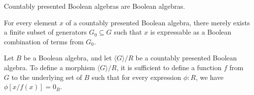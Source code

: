 \documentclass{../util/zariski-small}
\begin{document}
\begin{remark}
  Countably presented Boolean algebras are Boolean algebras. 
\end{remark}
\begin{remark}
  For every element $x$ of a countably presented Boolean algebra, 
  there merely exists a finite subset of generators $G_0\subseteq G$ such that $x$ is expressable 
  as a Boolean combination of terms from $G_0$. 
\end{remark}
\begin{remark}
  Let $B$ be a Boolean algebra, and let $\langle G \rangle / R$ be a countably presented Boolean algebra. 
  To define a morphism $\langle G \rangle / R$, it is sufficient to define a function $f$ from $G$ 
  to the underlying set of $B$ such that for every expression $\phi:R$, we have
  $\phi[x/f(x)] = 0_B$. 
\end{remark}
\end{document}
